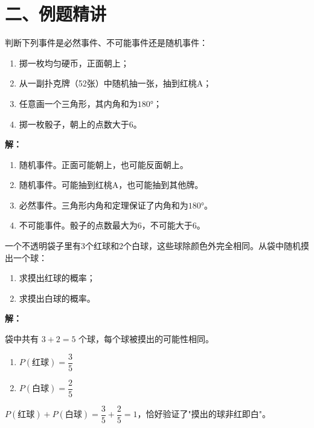 \documentclass[12pt, a4paper]{ctexart}
\begin{document}
\section*{\textcolor{examorange}{二、例题精讲}}

\begin{examplebox}[【例1】判断事件类型]
判断下列事件是必然事件、不可能事件还是随机事件：
\begin{enumerate}[label=(\arabic*)]
  \item 掷一枚均匀硬币，正面朝上；
  \item 从一副扑克牌（52张）中随机抽一张，抽到红桃A；
  \item 任意画一个三角形，其内角和为$180°$；
  \item 掷一枚骰子，朝上的点数大于6。
\end{enumerate}
\end{examplebox}

\textbf{解：}
\begin{enumerate}[label=(\arabic*)]
  \item 随机事件。正面可能朝上，也可能反面朝上。
  \item 随机事件。可能抽到红桃A，也可能抽到其他牌。
  \item 必然事件。三角形内角和定理保证了内角和为$180°$。
  \item 不可能事件。骰子的点数最大为6，不可能大于6。
\end{enumerate}

\begin{examplebox}[【例2】简单等可能事件的概率]
一个不透明袋子里有3个红球和2个白球，这些球除颜色外完全相同。从袋中随机摸出一个球：
\begin{enumerate}[label=(\arabic*)]
  \item 求摸出红球的概率；
  \item 求摸出白球的概率。
\end{enumerate}
\end{examplebox}

\textbf{解：}

袋中共有 $3 + 2 = 5$ 个球，每个球被摸出的可能性相同。
\begin{enumerate}[label=(\arabic*)]
  \item $P(\text{红球}) = \dfrac{3}{5}$
  \item $P(\text{白球}) = \dfrac{2}{5}$
\end{enumerate}

\begin{tipbox}[验证]
$P(\text{红球}) + P(\text{白球}) = \dfrac{3}{5} + \dfrac{2}{5} = 1$，恰好验证了"摸出的球非红即白"。
\end{tipbox}
\end{document}
